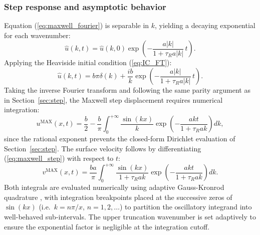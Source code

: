 \documentclass[extra]{gji}
\begin{document}
\subsubsection{Step response and asymptotic behavior}

Equation (\ref{eq:maxwell_fourier}) is separable in $k$, yielding a decaying
exponential for each wavenumber:
\begin{equation}
\hat{u}(k,t) = \hat{u}(k,0)\exp\!\left(-\frac{a|k|}{1+\tau_R a|k|}\,t\right).
\label{eq:maxwell_fourier_sol}
\end{equation}
Applying the Heaviside initial condition (\ref{eq:IC_FT}):
\begin{equation}
\hat{u}(k,t) = b\pi\delta(k)
  + \frac{ib}{k}\exp\!\left(-\frac{a|k|}{1+\tau_R a|k|}\,t\right).
\label{eq:maxwell_IC_evolved}
\end{equation}
Taking the inverse Fourier transform and following the same parity argument as
in Section~\ref{sec:step}, the Maxwell step displacement requires numerical
integration:
\begin{equation}
u^{\text{MAX}}(x,t) = \frac{b}{2}
  - \frac{b}{\pi}\int_0^{+\infty}
    \frac{\sin(kx)}{k}\exp\!\left(-\frac{akt}{1+\tau_R ak}\right)dk,
\label{eq:maxwell_step}
\end{equation}
since the rational exponent prevents the closed-form Dirichlet evaluation of
Section~\ref{sec:step}. The surface velocity follows by differentiating
(\ref{eq:maxwell_step}) with respect to $t$:
\begin{equation}
v^{\text{MAX}}(x,t) = \frac{b a}{\pi}\int_0^{+\infty}
  \frac{\sin(kx)}{1+\tau_R ak}
  \exp\!\left(-\frac{akt}{1+\tau_R ak}\right)dk.
\label{eq:maxwell_vel}
\end{equation}
Both integrals are evaluated numerically using adaptive Gauss-Kronrod
quadrature \citep{laurie1997calculation}, with integration breakpoints placed at the
successive zeros of $\sin(kx)$ (i.e.\ $k = n\pi/x$, $n = 1,2,\ldots$)
to partition the oscillatory integrand into well-behaved sub-intervals.
The upper truncation wavenumber is set adaptively to ensure the
exponential factor is negligible at the integration cutoff.
\end{document}
